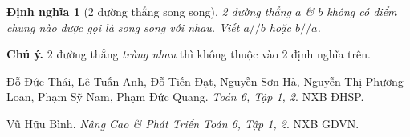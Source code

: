 \documentclass{article}
\numberwithin{equation}{section}
\newtheorem{definition}{Định nghĩa}[section]
\begin{document}
\begin{definition}[2 đường thẳng song song]
	2 đường thẳng $a$ \& $b$ không có điểm chung nào được gọi là \emph{song song với nhau}. Viết $a//b$ hoặc $b//a$.
\end{definition}
\textbf{Chú ý.} 2 đường thẳng \emph{trùng nhau} thì không thuộc vào 2 định nghĩa trên. 






\begin{thebibliography}{99}
	 Đỗ Đức Thái, Lê Tuấn Anh, Đỗ Tiến Đạt, Nguyễn Sơn Hà, Nguyễn Thị Phương Loan, Phạm Sỹ Nam, Phạm Đức Quang. \textit{Toán 6, Tập 1, 2}. NXB ĐHSP.
	
	 Vũ Hữu Bình. \textit{Nâng Cao \& Phát Triển Toán 6, Tập 1, 2}. NXB GDVN.
\end{thebibliography}

\printbibliography[heading=bibintoc]
	
\end{document}
